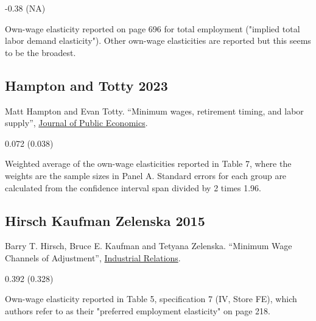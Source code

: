 \vspace{0.7em}

 -0.38 (NA)

\vspace{0.7em}

 Own-wage elasticity reported on page 696 for total employment ("implied total labor demand elasticity"). Other own-wage elasticities are reported but this seems to be the broadest.

\subsection*{Hampton and Totty 2023}
\vspace{-0.7em}

\noindent Matt Hampton and Evan Totty. ``Minimum wages, retirement timing, and labor supply'', \href{https://doi.org/10.1016/j.jpubeco.2023.104924}{Journal of Public Economics}.

\vspace{0.7em}

 0.072 (0.038)

\vspace{0.7em}

 Weighted average of the own-wage elasticities reported in Table 7, where the weights are the sample sizes in Panel A. Standard errors for each group are calculated from the confidence interval span divided by 2 times 1.96.

\subsection*{Hirsch Kaufman Zelenska 2015}
\vspace{-0.7em}

\noindent Barry T. Hirsch, Bruce E. Kaufman and Tetyana Zelenska. ``Minimum Wage Channels of Adjustment'', \href{https://doi.org/10.1111/irel.12091}{Industrial Relations}.

\vspace{0.7em}

 0.392 (0.328)

\vspace{0.7em}

 Own-wage elasticity reported in Table 5, specification 7 (IV, Store FE), which authors refer to as their "preferred employment elasticity" on page 218.

